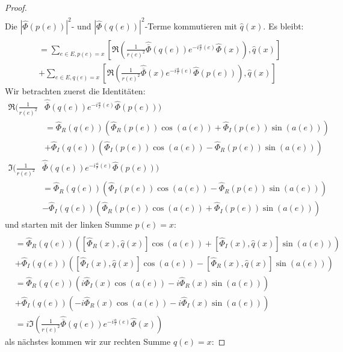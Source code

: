 \documentclass[11pt,a4paper,leqno]{report}
\numberwithin{equation}{chapter}
\begin{document}
\begin{proof}
\begin{align*}
	\end{align*}
Die $|\hat{\Phi}(p(e))|^2$- und $|\hat{\Phi}(q(e))|^2$-Terme kommutieren mit $\hat{q}(x)$. Es bleibt:
	\begin{align*}
		[\Re(\langle \frac{1}{r^2}\hat{\Phi}(q)e^{i\frac{a}{r}},&\hat{\Phi}(p) \rangle_{\mathfrak{K},\mathbb{C}}) ,\hat{q}(x)]\\&=
		\sum_{e\in E, p(e)=x}[\Re(\frac{1}{r(e)^2}\hat{\overline{\Phi}}(q(e))e^{-i\frac{a}{r}(e)}\hat{\Phi}(x)) ,\hat{q}(x)]\\&+
			\sum_{e\in E, q(e)=x}[\Re(\frac{1}{r(e)^2}\hat{\overline{\Phi}}(x)e^{-i\frac{a}{r}(e)}\hat{\Phi}(p(e))) ,\hat{q}(x)]	
		\end{align*}
	Wir betrachten zuerst die Identit\"aten:
	\begin{align*}
		\Re(\frac{1}{r(e)^2}&\hat{\overline{\Phi}}(q(e))e^{-i\frac{a}{r}(e)}\hat{\Phi}(p(e)))\\
		&=\hat{\Phi}_R(q(e))(\hat{\Phi}_R(p(e))\cos(a(e)) + \hat{\Phi}_I(p(e))\sin(a(e)))\\
		&+\hat{\Phi}_I(q(e))(\hat{\Phi}_I(p(e))\cos(a(e)) - \hat{\Phi}_R(p(e))\sin(a(e)))
	\end{align*}
	\begin{align*}
		 \Im(\frac{1}{r(e)^2}&\hat{\overline{\Phi}}(q(e))e^{-i\frac{a}{r}(e)}\hat{\Phi}(p(e)))\\
		&=\hat{\Phi}_R(q(e))(\hat{\Phi}_I(p(e))\cos(a(e)) - \hat{\Phi}_R(p(e))\sin(a(e)))\\
		&-\hat{\Phi}_I(q(e))(\hat{\Phi}_R(p(e))\cos(a(e)) + \hat{\Phi}_I(p(e))\sin(a(e)))
	\end{align*}
	und starten mit der linken Summe $p(e)=x$:
	\begin{align*}
		[\Re(\frac{1}{r(e)^2}&\hat{\overline{\Phi}}(q(e))e^{-i\frac{a}{r}(e)}\hat{\Phi}(x)), \hat{q}(x)]\\
		&=\hat{\Phi}_R(q(e))([\hat{\Phi}_R(x), \hat{q}(x)]\cos(a(e)) + [\hat{\Phi}_I(x), \hat{q}(x)]\sin(a(e)))\\
		&+\hat{\Phi}_I(q(e))([\hat{\Phi}_I(x), \hat{q}(x)]\cos(a(e)) - [\hat{\Phi}_R(x), \hat{q}(x)]\sin(a(e)))\\
		&=\hat{\Phi}_R(q(e))(i\hat{\Phi}_I(x)\cos(a(e)) - i\hat{\Phi}_R(x)\sin(a(e)))\\
		&+\hat{\Phi}_I(q(e))(-i\hat{\Phi}_R(x)\cos(a(e)) - i\hat{\Phi}_I(x)\sin(a(e)))\\
		&=i \Im(\frac{1}{r(e)^2}\hat{\overline{\Phi}}(q(e))e^{-i\frac{a}{r}(e)}\hat{\Phi}(x))
	\end{align*}
	als n\"achstes kommen wir zur rechten Summe $q(e)=x$:

\end{proof}
\end{document}
